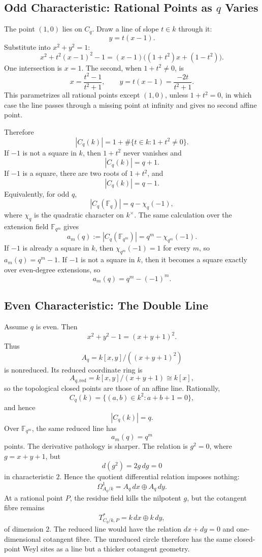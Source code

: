 \subsection{Odd Characteristic: Rational Points as \texorpdfstring{\(q\)}{q} Varies}
The point \((1,0)\) lies on \(C_q\).  Draw a line of slope \(t\in k\) through
it:
\[
  y=t(x-1).
\]
Substitute into \(x^2+y^2=1\):
\[
  x^2+t^2(x-1)^2-1=(x-1)\bigl((1+t^2)x+(1-t^2)\bigr).
\]
One intersection is \(x=1\).  The second, when \(1+t^2\ne0\), is
\[
  x=\frac{t^2-1}{t^2+1},\qquad
  y=t(x-1)=\frac{-2t}{t^2+1}.
\]
This parametrizes all rational points except \((1,0)\), unless
\(1+t^2=0\), in which case the line passes through a missing point at
infinity and gives no second affine point.

Therefore
\[
  |C_q(k)|=1+\#\{t\in k:1+t^2\ne0\}.
\]
If \(-1\) is not a square in \(k\), then \(1+t^2\) never vanishes and
\[
  |C_q(k)|=q+1.
\]
If \(-1\) is a square, there are two roots of \(1+t^2\), and
\[
  |C_q(k)|=q-1.
\]
Equivalently, for odd \(q\),
\[
  |C_q(\mathbb F_q)|=q-\chi_q(-1),
\]
where \(\chi_q\) is the quadratic character on \(k^\times\).
The same calculation over the extension field \(\mathbb F_{q^m}\) gives
\[
  a_m(q):=|C_q(\mathbb F_{q^m})|=q^m-\chi_{q^m}(-1).
\]
If \(-1\) is already a square in \(k\), then \(\chi_{q^m}(-1)=1\) for every
\(m\), so \(a_m(q)=q^m-1\).  If \(-1\) is not a square in \(k\), then it
becomes a square exactly over even-degree extensions, so
\[
  a_m(q)=q^m-(-1)^m.
\]
\subsection{Even Characteristic: The Double Line}
Assume \(q\) is even.  Then
\[
  x^2+y^2-1=(x+y+1)^2.
\]
Thus
\[
  A_q=k[x,y]/((x+y+1)^2)
\]
is nonreduced.  Its reduced coordinate ring is
\[
  A_{q,\mathrm{red}}=k[x,y]/(x+y+1)\cong k[x],
\]
so the topological closed points are those of an affine line.  Rationally,
\[
  C_q(k)=\{(a,b)\in k^2:a+b+1=0\},
\]
and hence
\[
  |C_q(k)|=q.
\]
Over \(\mathbb F_{q^m}\), the same reduced line has
\[
  a_m(q)=q^m
\]
points.
The derivative pathology is sharper.  The relation is \(g^2=0\), where
\(g=x+y+1\), but
\[
  d(g^2)=2g\,dg=0
\]
in characteristic \(2\).  Hence the quotient differential relation imposes
nothing:
\[
  \Omega^1_{A_q/k}=A_q\,dx\oplus A_q\,dy.
\]
At a rational point \(P\), the residue field kills the nilpotent \(g\), but
the cotangent fibre remains
\[
  T^*_{C_q/k,P}=k\,dx\oplus k\,dy,
\]
of dimension \(2\).  The reduced line would have the relation \(dx+dy=0\) and
one-dimensional cotangent fibre.  The unreduced circle therefore has the same
closed-point Weyl sites as a line but a thicker cotangent geometry.
